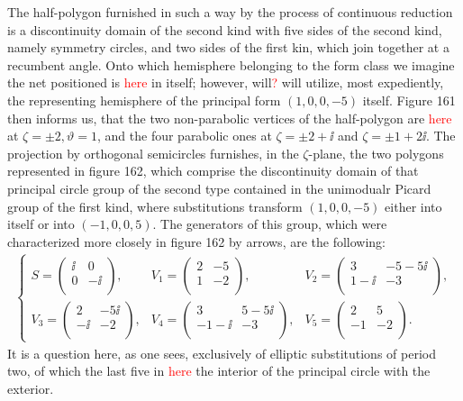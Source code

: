 The half-polygon furnished in such a way by the process of continuous reduction is a discontinuity domain of the second kind with five sides of the second kind, namely symmetry circles, and two sides of the first kin, which join together at a recumbent angle. Onto which hemisphere belonging to the form class we imagine the net positioned is \textcolor{red}{here} in itself; however, will\textcolor{red}{?} will utilize, most expediently, the representing hemisphere of the principal form $(1,0,0,-5)$ itself. Figure 161 then informs us, that the two non-parabolic vertices of the half-polygon are \textcolor{red}{here} at $\zeta=\pm 2,\vartheta=1$, and the four parabolic ones at $\zeta=\pm 2+\ii$ and $\zeta=\pm 1+2\ii$. The projection by orthogonal semicircles furnishes, in the $\zeta$-plane, the two polygons represented in figure 162, which comprise the discontinuity domain of that principal circle group of the second type contained in the unimodualr Picard group of the first kind, where substitutions transform $(1,0,0,-5)$ either into itself or into $(-1,0,0,5)$. The generators of this group, which were characterized more closely in figure 162 by arrows, are the following:
\begin{align}\label{eq:95}
    \left\{\begin{array}{ccc}
    S=\left(\begin{array}{cc}
    \ii & 0\\
    0 & -\ii\\
    \end{array}\right), & V_1=\left(\begin{array}{cc}
    2 & -5 \\
    1 & -2 \\
    \end{array}\right), & V_2=\left(\begin{array}{cc}
    3 & -5-5\ii\\
    1-\ii & -3\\
    \end{array}\right),\\
    V_3=\left(\begin{array}{cc}
    2 & -5\ii\\
    -\ii & -2\\
    \end{array}\right), & V_4=\left(\begin{array}{cc}
    3 & 5-5\ii\\
    -1-\ii & -3\\
    \end{array}\right), & V_5=\left(\begin{array}{cc}
    2 & 5\\
    -1 & -2\\
    \end{array}\right).
    \end{array}\right.
\end{align}
It is a question here, as one sees, exclusively of elliptic substitutions of period two, of which the last five in \textcolor{red}{here} the interior of the principal circle with the exterior.

